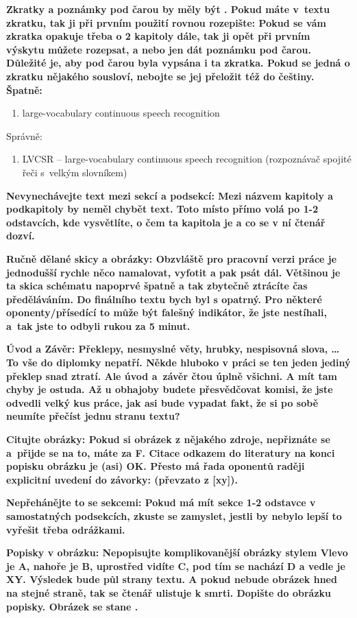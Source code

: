 \bf Zkratky a poznámky pod čarou by měly být . Pokud máte v~textu zkratku, tak ji při prvním použití rovnou rozepište: \rm Pokud se vám zkratka opakuje třeba o 2 kapitoly dále, tak ji opět při prvním výskytu můžete rozepsat, a nebo jen dát poznámku pod čarou. Důležité je, aby pod čarou byla vypsána i ta zkratka. Pokud se jedná o zkratku nějakého  sousloví, nebojte se jej přeložit též do češtiny.
Špatně:
\begin{enumerate}
  \item{large-vocabulary continuous speech recognition}
\end{enumerate}
Správně:
\begin{enumerate}
  \item{LVCSR -- large-vocabulary continuous speech recognition (rozpoznávač spojité řeči s~velkým slovníkem)}
\end{enumerate}

\bf Nevynechávejte text mezi sekcí a podsekcí: \rm Mezi názvem kapitoly a podkapitoly by neměl chybět text. Toto místo přímo volá po 1-2 odstavcích, kde vysvětlíte, o čem ta kapitola je a co se v ní čtenář dozví.

\bf Ručně dělané skicy a obrázky: \rm Obzvláště pro pracovní verzi práce je jednodušší rychle něco namalovat, vyfotit a pak psát dál. Většinou je ta skica schématu napoprvé špatně a tak zbytečně ztrácíte čas předěláváním. Do finálního textu bych byl s  opatrný. Pro některé oponenty/přísedící to může být falešný indikátor, že jste nestíhali, a~tak jste to odbyli rukou za 5 minut.

\bf Úvod a Závěr: \rm Překlepy, nesmyslné věty, hrubky, nespisovná slova, \ldots  To vše do diplomky nepatří. Někde hluboko v práci se ten jeden jediný překlep snad ztratí. Ale úvod a~závěr čtou úplně všichni. A mít tam chyby je ostuda. Až u obhajoby budete přesvědčovat komisi, že jste odvedli velký kus práce, jak asi bude vypadat fakt, že si po sobě neumíte přečíst jednu stranu textu?

\bf Citujte obrázky: \rm Pokud si  obrázek z nějakého zdroje, nepřiznáte se a~přijde se na to, máte za F. Citace odkazem do literatury na konci popisku obrázku je (asi) OK. Přesto má řada oponentů raději explicitní uvedení do závorky: (převzato z [xy]).

\bf Nepřehánějte to se sekcemi: \rm Pokud má mít sekce 1-2 odstavce v samostatných podsekcích, zkuste se zamyslet, jestli by nebylo lepší to vyřešit třeba odrážkami.

\bf Popisky v obrázku: \rm Nepopisujte komplikovanější obrázky stylem Vlevo je A, nahoře je B, uprostřed vidíte C, pod tím se nachází D a vedle je XY. Výsledek bude půl strany textu. A pokud nebude obrázek hned na stejné straně, tak se čtenář ulistuje k smrti. Dopište do obrázku popisky. Obrázek se stane .

